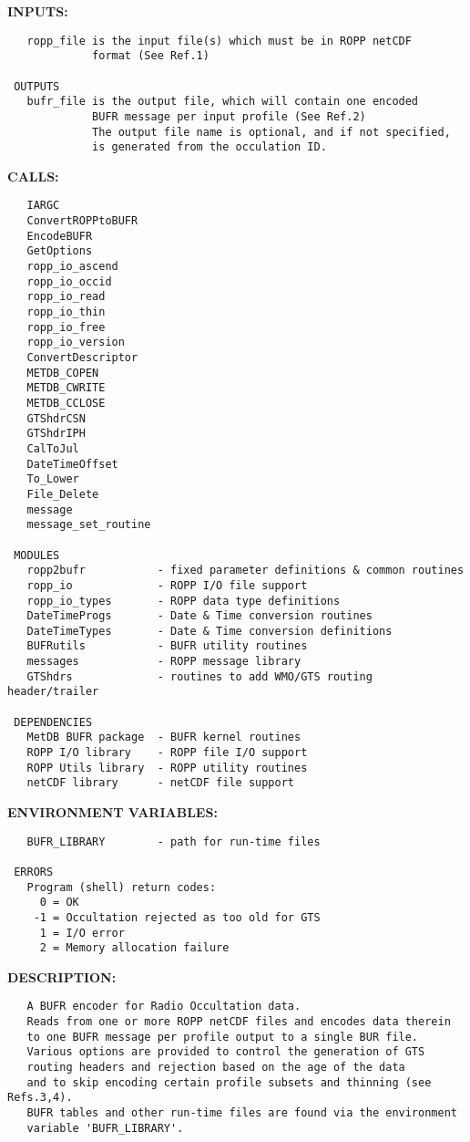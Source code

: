 \textbf{INPUTS:}\hspace{0.08in}\begin{Verbatim}
   ropp_file is the input file(s) which must be in ROPP netCDF
             format (See Ref.1)

 OUTPUTS
   bufr_file is the output file, which will contain one encoded
             BUFR message per input profile (See Ref.2)
             The output file name is optional, and if not specified,
             is generated from the occulation ID.
\end{Verbatim}
\textbf{CALLS:}\hspace{0.08in}\begin{Verbatim}
   IARGC
   ConvertROPPtoBUFR
   EncodeBUFR
   GetOptions
   ropp_io_ascend
   ropp_io_occid
   ropp_io_read
   ropp_io_thin
   ropp_io_free
   ropp_io_version
   ConvertDescriptor
   METDB_COPEN
   METDB_CWRITE
   METDB_CCLOSE
   GTShdrCSN
   GTShdrIPH
   CalToJul
   DateTimeOffset
   To_Lower
   File_Delete
   message
   message_set_routine

 MODULES
   ropp2bufr           - fixed parameter definitions & common routines
   ropp_io             - ROPP I/O file support
   ropp_io_types       - ROPP data type definitions
   DateTimeProgs       - Date & Time conversion routines
   DateTimeTypes       - Date & Time conversion definitions
   BUFRutils           - BUFR utility routines
   messages            - ROPP message library
   GTShdrs             - routines to add WMO/GTS routing header/trailer

 DEPENDENCIES
   MetDB BUFR package  - BUFR kernel routines
   ROPP I/O library    - ROPP file I/O support
   ROPP Utils library  - ROPP utility routines
   netCDF library      - netCDF file support
\end{Verbatim}
\textbf{ENVIRONMENT VARIABLES:}\hspace{0.08in}\begin{Verbatim}
   BUFR_LIBRARY        - path for run-time files

 ERRORS
   Program (shell) return codes:
     0 = OK
    -1 = Occultation rejected as too old for GTS
     1 = I/O error
     2 = Memory allocation failure
\end{Verbatim}
\textbf{DESCRIPTION:}\hspace{0.08in}\begin{Verbatim}
   A BUFR encoder for Radio Occultation data.
   Reads from one or more ROPP netCDF files and encodes data therein
   to one BUFR message per profile output to a single BUR file.
   Various options are provided to control the generation of GTS
   routing headers and rejection based on the age of the data
   and to skip encoding certain profile subsets and thinning (see Refs.3,4).
   BUFR tables and other run-time files are found via the environment
   variable 'BUFR_LIBRARY'.
\end{Verbatim}
